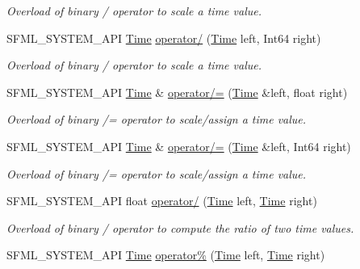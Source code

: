 \begin{DoxyCompactItemize}
\begin{DoxyCompactList}\small\item\em Overload of binary / operator to scale a time value. \end{DoxyCompactList}\item 
S\+F\+M\+L\+\_\+\+S\+Y\+S\+T\+E\+M\+\_\+\+A\+PI \mbox{\hyperlink{classsf_1_1_time}{Time}} \mbox{\hyperlink{classsf_1_1_time_ab72f2de3e2bb592b4b4008dc1ac79056}{operator/}} (\mbox{\hyperlink{classsf_1_1_time}{Time}} left, Int64 right)
\begin{DoxyCompactList}\small\item\em Overload of binary / operator to scale a time value. \end{DoxyCompactList}\item 
S\+F\+M\+L\+\_\+\+S\+Y\+S\+T\+E\+M\+\_\+\+A\+PI \mbox{\hyperlink{classsf_1_1_time}{Time}} \& \mbox{\hyperlink{classsf_1_1_time_a9835490c54cab06492ec3aa9e9275ef9}{operator/=}} (\mbox{\hyperlink{classsf_1_1_time}{Time}} \&left, float right)
\begin{DoxyCompactList}\small\item\em Overload of binary /= operator to scale/assign a time value. \end{DoxyCompactList}\item 
S\+F\+M\+L\+\_\+\+S\+Y\+S\+T\+E\+M\+\_\+\+A\+PI \mbox{\hyperlink{classsf_1_1_time}{Time}} \& \mbox{\hyperlink{classsf_1_1_time_ad51871e3db77def834ae8688e64504ff}{operator/=}} (\mbox{\hyperlink{classsf_1_1_time}{Time}} \&left, Int64 right)
\begin{DoxyCompactList}\small\item\em Overload of binary /= operator to scale/assign a time value. \end{DoxyCompactList}\item 
S\+F\+M\+L\+\_\+\+S\+Y\+S\+T\+E\+M\+\_\+\+A\+PI float \mbox{\hyperlink{classsf_1_1_time_ac3ae4f4d24a93e088d8e36d68322ea0f}{operator/}} (\mbox{\hyperlink{classsf_1_1_time}{Time}} left, \mbox{\hyperlink{classsf_1_1_time}{Time}} right)
\begin{DoxyCompactList}\small\item\em Overload of binary / operator to compute the ratio of two time values. \end{DoxyCompactList}\item 
S\+F\+M\+L\+\_\+\+S\+Y\+S\+T\+E\+M\+\_\+\+A\+PI \mbox{\hyperlink{classsf_1_1_time}{Time}} \mbox{\hyperlink{classsf_1_1_time_aafb8b12fb0ac0e366d6ea9c9e9f93335}{operator\%}} (\mbox{\hyperlink{classsf_1_1_time}{Time}} left, \mbox{\hyperlink{classsf_1_1_time}{Time}} right)

\end{DoxyCompactItemize}

